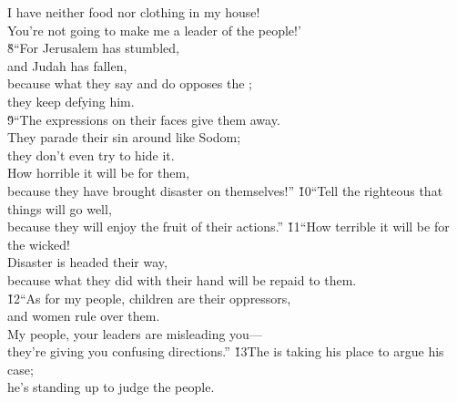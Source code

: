 \begin{poetry}
\poeml I have neither food nor clothing in my house! \\
\poemll    You're not going to make me a leader of the people!' \\
\poeml \v{8}``For Jerusalem has stumbled, \\
\poemll    and Judah has fallen, \\
\poeml because what they say and do opposes the ; \\
\poemll    they keep defying him. \\
\poeml \v{9}``The expressions on their faces give them away. \\
\poemll    They parade their sin around like Sodom; \\
\poemlll       they don't even try to hide it. \\
\poeml How horrible it will be for them, \\
\poemll    because they have brought disaster on themselves!''
\poeml \v{10}``Tell the righteous that things will go well, \\
\poemll    because they will enjoy the fruit of their actions.''
\poeml \v{11}``How terrible it will be for the wicked! \\
\poemll    Disaster is headed their way, \\
\poemlll       because what they did with their hand will be repaid to them. \\
\poeml \v{12}``As for my people, children are their oppressors, \\
\poemll    and women rule over them. \\
\poeml My people, your leaders are misleading you--- \\
\poemll    they're giving you confusing directions.''
\poeml \v{13}The  is taking his place to argue his case; \\
\poemll    he's standing up to judge the people. \\

\end{poetry}
